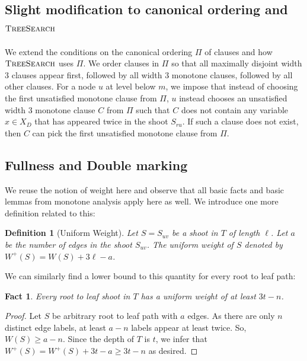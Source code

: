 \documentclass[10pt,a4paper]{article}
\newtheorem{fact}{Fact}
\newtheorem{definition}{Definition}
\newcommand{\ts}{\textsc{TreeSearch}}
\begin{document}

\subsection{Slight modification to canonical ordering and $\ts$}

We extend the conditions on the canonical ordering $\Pi$ of clauses and how $\ts$ uses $\Pi$. We order clauses in $\Pi$ so that all maximally disjoint width $3$ clauses appear first, followed by all width $3$ monotone clauses, followed by all other clauses.
For a node $u$ at level below $m$, we impose that instead of choosing the first unsatisfied monotone clause from $\Pi$, $u$ instead chooses an unsatisfied width $3$ monotone clause $C$ from $\Pi$ such that $C$ does not contain any variable $x\in X_D$ that has appeared twice in the shoot $S_{ru}$. If such a clause does not exist, then $C$ can pick the first unsatisfied monotone clause from $\Pi$.




\subsection{Fullness and Double marking}

We reuse the notion of weight here and observe that all basic facts and basic lemmas from monotone analysis apply here as well. We introduce one more definition related to this:

\begin{definition}[Uniform Weight]
Let $S = S_{uv}$ be a shoot in $T$ of length $\ell$. 
Let $a$ be the number of edges in the shoot $S_{uv}$.
The \emph{uniform weight} of $S$ denoted by $W^{+}(S) = W(S) + 3\ell - a$.
\end{definition}

We can similarly find a lower bound to this quantity for every root to leaf path:

\begin{fact}
\label{fact:shoot-uniform-extended-weight-lower-bound}
Every root to leaf shoot in $T$ has a uniform weight of
at least $3t - n$.
\end{fact}

\begin{proof}
Let $S$ be arbitrary root to leaf path with $a$ edges.
As there are only $n$ distinct edge labels, at least $a-n$ labels appear at least twice. So, $W(S) \ge a - n$.
Since the depth of $T$ is $t$, we infer that $W^{+}(S) = W^+(S) + 3t - a \ge 3t - n$ as desired.
\end{proof}
\end{document}
